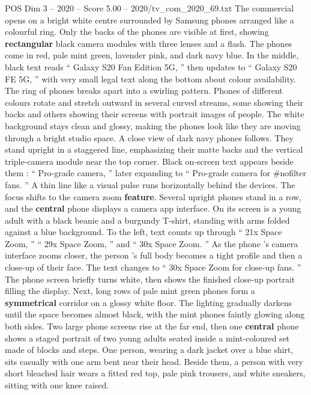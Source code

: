 \begin{textsample}{POS Dim 3 – 2020 – Score 5.00 – 2020/tv\_com\_2020\_69.txt}  \label{ex:f3_pos_075}
The commercial opens on a bright white centre surrounded by Samsung phones arranged like a colourful ring.
Only the backs of the phones are visible at first, showing \textbf{rectangular} black camera modules with three lenses and a flash.
The phones come in red, pale mint green, lavender pink, and dark navy blue.
In the middle, black text reads “ Galaxy S20 Fan Edition 5G, ” then updates to “ Galaxy S20 FE 5G, ” with very small legal text along the bottom about colour availability.
The ring of phones breaks apart into a swirling pattern.
Phones of different colours rotate and stretch outward in several curved streams, some showing their backs and others showing their screens with portrait images of people.
The white background stays clean and glossy, making the phones look like they are moving through a bright studio space.
A close view of dark navy phones follows.
They stand upright in a staggered line, emphasizing their matte backs and the vertical triple-camera module near the top corner.
Black on-screen text appears beside them : “ Pro-grade camera, ” later expanding to “ Pro-grade camera for \#nofilter fans. ” A thin line like a visual pulse runs horizontally behind the devices.
The focus shifts to the camera zoom \textbf{feature}.
Several upright phones stand in a row, and the \textbf{central} phone displays a camera app interface.
On its screen is a young adult with a black beanie and a burgundy T-shirt, standing with arms folded against a blue background.
To the left, text counts up through “ 21x Space Zoom, ” “ 29x Space Zoom, ” and “ 30x Space Zoom. ” As the phone ’s camera interface zooms closer, the person ’s full body becomes a tight profile and then a close-up of their face.
The text changes to “ 30x Space Zoom for close-up fans. ” The phone screen briefly turns white, then shows the finished close-up portrait filling the display.
Next, long rows of pale mint green phones form a \textbf{symmetrical} corridor on a glossy white floor.
The lighting gradually darkens until the space becomes almost black, with the mint phones faintly glowing along both sides.
Two large phone screens rise at the far end, then one \textbf{central} phone shows a staged portrait of two young adults seated inside a mint-coloured set made of blocks and steps.
One person, wearing a dark jacket over a blue shirt, sits casually with one arm bent near their head.
Beside them, a person with very short bleached hair wears a fitted red top, pale pink trousers, and white sneakers, sitting with one knee raised.

\end{textsample}

